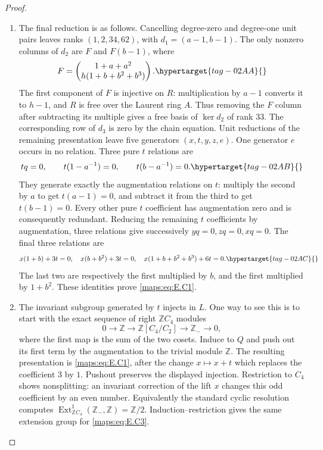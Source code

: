 \documentclass[11pt,a4paper]{article}
\numberwithin{equation}{section}
\theoremstyle{definition}
\newcommand{\h}{\mathfrak h}\newcommand{\hz}{\mathfrak h_z}\newcommand{\Acon}{\mathfrak A}\newcommand{\wt}[1]{\widehat{#1}}
\begin{document}
\begin{proof}
\begin{enumerate}[label=\arabic*.,leftmargin=*]
\item The final reduction is as follows. Cancelling degree-zero
and degree-one unit pairs leaves ranks $(1,2,34,62)$,
with $d_1=(a-1,b-1)$. The only nonzero columns of
$d_2$ are $F$ and $F(b-1)$, where
\begin{equation}
 F=\begin{pmatrix}1+a+a^2\\h(1+b+b^2+b^3)\end{pmatrix}.
 \hypertarget{tag-02AA}{}\label{maps:eq:E.C15}
\end{equation}
The first component of $F$ is injective on $R$:
multiplication by $a-1$ converts it to $h-1$, and
$R$ is free over the Laurent ring $A$. Thus removing
the $F$ column after subtracting its multiple gives
a free basis of $\ker d_2$ of rank $33$. The corresponding
row of $d_3$ is zero by the chain equation. Unit
reductions of the remaining presentation leave five
generators $(x,t,y,z,e)$. One generator $e$ occurs
in no relation. Three pure $t$ relations are
\begin{equation}
 tq=0,\qquad t(1-a^{-1})=0,
                  \qquad t(b-a^{-1})=0.
 \hypertarget{tag-02AB}{}\label{maps:eq:E.C16}
\end{equation}
They generate exactly the augmentation relations on
$t$: multiply the second by $a$ to get $t(a-1)=0$,
and subtract it from the third to get $t(b-1)=0$.
Every other pure $t$ coefficient has augmentation
zero and is consequently redundant. Reducing the
remaining $t$ coefficients by augmentation, three
relations give successively $yq=0,zq=0,xq=0$.
The final three relations are
\begin{equation}
 x(1+b)+3t=0,\quad x(b+b^2)+3t=0,
                   \quad x(1+b+b^2+b^3)+6t=0.
 \hypertarget{tag-02AC}{}\label{maps:eq:E.C17}
\end{equation}
The last two are respectively the first multiplied
by $b$, and the first multiplied by $1+b^2$.
These identities prove \eqref{maps:eq:E.C1}.

\item The invariant subgroup generated by $t$ injects in
$L$. One way to see this is to start with the exact
sequence of right $\mathbb ZC_4$ modules
\[
 0\longrightarrow\mathbb Z\longrightarrow
 \mathbb Z[C_4/C_2]\longrightarrow\mathbb Z_-\longrightarrow0,
\]
where the first map is the sum of the two cosets.
Induce to $Q$ and push out its first term by the
augmentation to the trivial module $\mathbb Z$.
The resulting presentation is \eqref{maps:eq:E.C1}, after the
change $x\mapsto x+t$ which replaces the coefficient
$3$ by $1$. Pushout preserves the displayed injection.
Restriction to $C_4$ shows nonsplitting: an invariant
correction of the lift $x$ changes this odd coefficient
by an even number. Equivalently the standard cyclic
resolution computes
$\operatorname{Ext}^1_{\mathbb ZC_4}(\mathbb Z_-,\mathbb Z)
=\mathbb Z/2$. Induction--restriction gives the same
extension group for \eqref{maps:eq:E.C3}.


\end{enumerate}
\end{proof}
\end{document}
